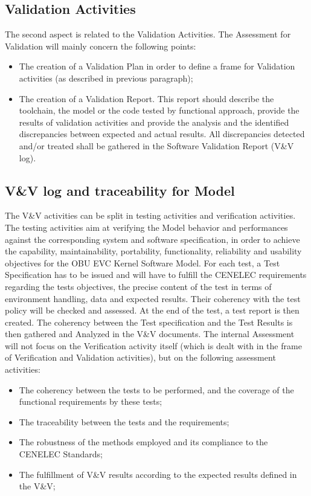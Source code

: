 \documentclass{template/openetcs_report}
\begin{document}
\subsection{Validation Activities}
The second aspect is related to the Validation Activities. The Assessment for Validation will mainly concern the following points:
\begin{itemize}
\item The creation of a Validation Plan in order to define a frame for Validation activities (as described in previous paragraph);
\item The creation of a Validation Report. This report should describe the toolchain, the model or the code tested by functional approach, provide the results of validation activities and provide the analysis and the identified discrepancies  between expected and actual results. All discrepancies detected and/or treated shall be gathered in the Software Validation Report (V\&V log).
\end{itemize}

\subsection{V\&V log and traceability for Model}
The V\&V activities can be split in testing activities and verification activities. The testing activities aim at verifying the Model behavior and performances against the corresponding system and software specification, in order to achieve the capability, maintainability, portability, functionality, reliability and usability objectives for the OBU EVC Kernel Software Model. 
For each test, a Test Specification has to be issued and will have to fulfill the CENELEC requirements regarding the tests objectives, the precise content of the test in terms of environment handling, data and expected results. Their coherency with the test policy will be checked and assessed. At the end of the test, a test report is then created. The coherency between the Test specification and the Test Results is then gathered and Analyzed in the V\&V documents.
The internal Assessment will not focus on the Verification activity itself (which is dealt with in the frame of Verification and Validation activities), but on the following assessment activities:
\begin{itemize}
\item The coherency between the tests to be performed, and the coverage of the functional requirements by these tests;
\item The traceability between the tests and the requirements;
\item The robustness of the  methods employed and its compliance to the CENELEC Standards;
\item The fulfillment of V\&V results according to the expected results defined in the V\&V;
\end{itemize}
\end{document}

